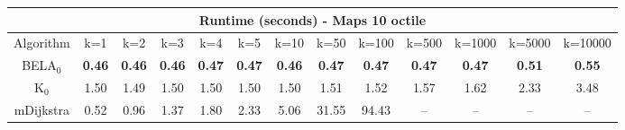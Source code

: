 \begin{tabular}{c|cccccccccccc}\toprule
\multicolumn{13}{c}{Runtime (seconds) - Maps 10 octile}\\ \midrule
Algorithm & k=1 & k=2 & k=3 & k=4 & k=5 & k=10 & k=50 & k=100 & k=500 & k=1000 & k=5000 & k=10000 \\ \midrule
BELA$_0$ & \textbf{0.46} & \textbf{0.46} & \textbf{0.46} & \textbf{0.47} & \textbf{0.47} & \textbf{0.46} & \textbf{0.47} & \textbf{0.47} & \textbf{0.47} & \textbf{0.47} & \textbf{0.51} & \textbf{0.55} \\
K$_0$ & 1.50 & 1.49 & 1.50 & 1.50 & 1.50 & 1.50 & 1.51 & 1.52 & 1.57 & 1.62 & 2.33 & 3.48 \\
mDijkstra & 0.52 & 0.96 & 1.37 & 1.80 & 2.33 & 5.06 & 31.55 & 94.43 & -- & -- & -- & -- \\ \bottomrule 
\end{tabular}
